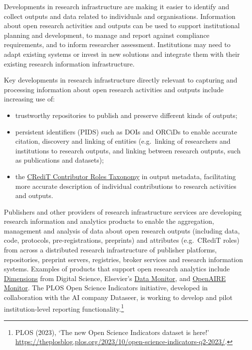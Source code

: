 \documentclass[
  letterpaper,
  DIV=11,
  numbers=noendperiod,
  oneside]{scrreprt}
\begin{document}
Developments in research infrastructure are making it easier to identify
and collect outputs and data related to individuals and organisations.
Information about open research activities and outputs can be used to
support institutional planning and development, to manage and report
against compliance requirements, and to inform researcher assessment.
Institutions may need to adapt existing systems or invest in new
solutions and integrate them with their existing research information
infrastructure.

Key developments in research infrastructure directly relevant to
capturing and processing information about open research activities and
outputs include increasing use of:

\begin{itemize}
\item
  trustworthy repositories to publish and preserve different kinds of
  outputs;
\item
  persistent identifiers (PIDS) such as DOIs and ORCiDs to enable
  accurate citation, discovery and linking of entities (e.g.~linking of
  researchers and institutions to research outputs, and linking between
  research outputs, such as publications and datasets);
\item
  the \href{https://credit.niso.org/}{CRediT Contributor Roles Taxonomy}
  in output metadata, facilitating more accurate description of
  individual contributions to research activities and outputs.
\end{itemize}

Publishers and other providers of research infrastructure services are
developing research information and analytics products to enable the
aggregation, management and analysis of data about open research outputs
(including data, code, protocols, pre-registrations, preprints) and
attributes (e.g.~CRediT roles) from across a distributed research
infrastructure of publisher platforms, repositories, preprint servers,
registries, broker services and research information systems. Examples
of products that support open research analytics include
\href{https://www.dimensions.ai/products/}{Dimensions} from Digital
Science, Elsevier's
\href{https://www.elsevier.com/en-gb/products/data-monitor}{Data
Monitor}, and \href{https://monitor.openaire.eu/}{OpenAIRE Monitor}. The
PLOS Open Science Indicators initiative, developed in collaboration with
the AI company Dataseer, is working to develop and pilot
institution-level reporting functionality.\footnote{PLOS (2023), `The
  new Open Science Indicators dataset is here!'
  \url{https://theplosblog.plos.org/2023/10/open-science-indicators-q2-2023/}.}
\end{document}
